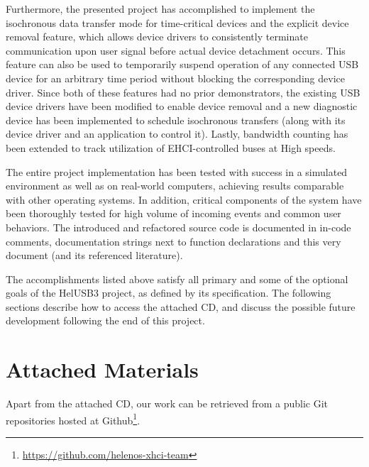 Furthermore, the presented project has accomplished to implement the isochronous
data transfer mode for time-critical devices and the explicit device removal
feature, which allows device drivers to consistently terminate communication
upon user signal before actual device detachment occurs. This feature can also
be used to temporarily suspend operation of any connected USB device for an
arbitrary time period without blocking the corresponding device driver. Since
both of these features had no prior demonstrators, the existing USB device
drivers have been modified to enable device removal and a new diagnostic device
has been implemented to schedule isochronous transfers (along with its device
driver and an application to control it). Lastly, bandwidth counting has been
extended to track utilization of EHCI-controlled buses at High speeds.

The entire project implementation has been tested with success in a simulated
environment as well as on real-world computers, achieving results comparable
with other operating systems. In addition, critical components of the system
have been thoroughly tested for high volume of incoming events and common user
behaviors. The introduced and refactored source code is documented in in-code
comments, documentation strings next to function declarations and this very
document (and its referenced literature).

The accomplishments listed above satisfy all primary and some of the optional
goals of the HelUSB3 project, as defined by its specification. The following
sections describe how to access the attached CD, and discuss the possible future
development following the end of this project.


\section{Attached Materials}

Apart from the attached CD, our work can be retrieved from a public Git repositories
hosted at Github\footnote{\href{https://github.com/helenos-xhci-team}{https://github.com/helenos-xhci-team}}.

